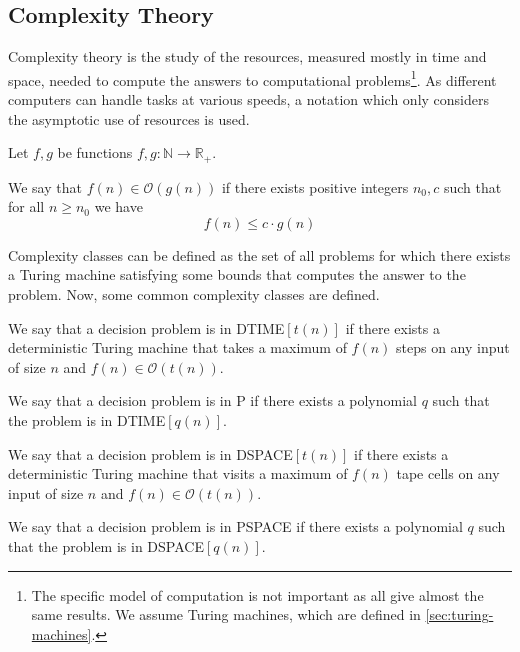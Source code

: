 \subsection{Complexity Theory}\label{subsec:complexity-theory}

Complexity theory is the study of the resources, measured mostly in time and space, needed to compute the answers to computational problems\footnote{The specific model of computation is not important as all give almost the same results. We assume Turing machines, which are defined in \cref{sec:turing-machines}.}.
As different computers can handle tasks at various speeds, a notation which only considers the asymptotic use of resources is used.

\begin{define}
    Let $f, g$ be functions $f, g: \mathbb{N} \to \mathbb{R}_+$.

    We say that $f(n) \in \mathcal{O}(g(n))$ if there exists positive integers $n_0, c$ such that for all $n \geq n_0$ we have \[f(n) \leq c\cdot g(n)\]
\end{define}

Complexity classes can be defined as the set of all problems for which there exists a Turing machine satisfying some bounds that computes the answer to the problem.
Now, some common complexity classes are defined.

\begin{define}
[{DTIME$[t(n)]$}]
    We say that a decision problem is in DTIME$[t(n)]$ if there exists a deterministic Turing machine that takes a maximum of $f(n)$ steps on any input of size $n$ and $f(n) \in \mathcal{O}(t(n))$.
\end{define}

\begin{define}[P]
    We say that a decision problem is in P if there exists a polynomial $q$ such that the problem is in DTIME$[q(n)]$.
\end{define}

\begin{define}
[{DSPACE$[t(n)]$}]
    We say that a decision problem is in DSPACE$[t(n)]$ if there exists a deterministic Turing machine that visits a maximum of $f(n)$ tape cells on any input of size $n$ and $f(n) \in \mathcal{O}(t(n))$.
\end{define}

\begin{define}[PSPACE]
    We say that a decision problem is in PSPACE if there exists a polynomial $q$ such that the problem is in DSPACE$[q(n)]$.
\end{define}

